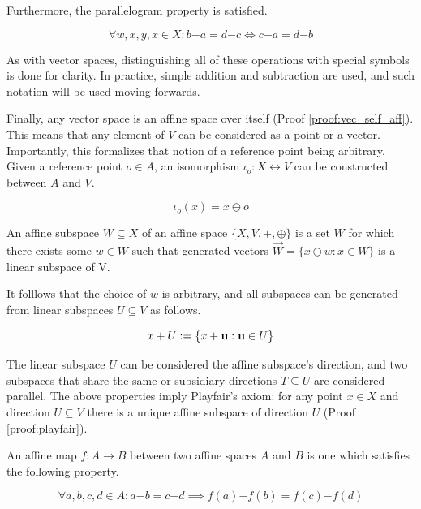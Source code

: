 Furthermore, the parallelogram property is satisfied.

\begin{equation}
	\forall w, x, y, x \in X: b \dot{-} a = d \dot{-} c \Longleftrightarrow c \dot{-} a = d \dot{-} b
\end{equation}

As with vector spaces, distinguishing all of these operations with special symbols is done for clarity. In practice, simple addition and subtraction are used, and such notation will be used moving forwards.

Finally, any vector space is an affine space over itself (Proof \ref{proof:vec_self_aff}). This means that any element of $V$ can be considered as a point or a vector. Importantly, this formalizes that notion of a reference point being arbitrary. Given a reference point $o \in A$, an isomorphism $\iota_{o}: X \leftrightarrow V$ can be constructed between $A$ and $V$.

\begin{equation}
	\iota_{o}(x) = x \ominus o
\end{equation}

\begin{definition}
	An affine subspace $W \subseteq X$ of an affine space $\{ X, V, +, \oplus \}$ is a set $W$ for which there exists some $w \in W$ such that generated vectors $\overrightarrow{W} = \{ x \ominus w: x \in W \}$ is a linear subspace of V.
\end{definition}

It folllows that the choice of $w$ is arbitrary, and all subspaces can be generated from linear subspaces $U \subseteq V$ as follows.

\begin{equation}
	x + U := \{ x + \vb{u}: \vb{u} \in U \}
\end{equation}

The linear subspace $U$ can be considered the affine subspace's direction, and two subspaces that share the same or subsidiary directions $T \subseteq U$ are considered parallel. The above properties imply Playfair's axiom: for any point $x \in X$ and direction $U \subseteq V$ there is a unique affine subspace of direction $U$ (Proof \ref{proof:playfair}).

\begin{definition}
	An affine map $f: A \rightarrow B$ between two affine spaces $A$ and $B$ is one which satisfies the following property.
	
	\begin{equation}
		\forall a, b, c, d \in A: a \dot{-} b = c \dot{-} d \implies f(a) \dot{-} f(b) = f(c) \dot{-} f(d)
	\end{equation}
\end{definition}

